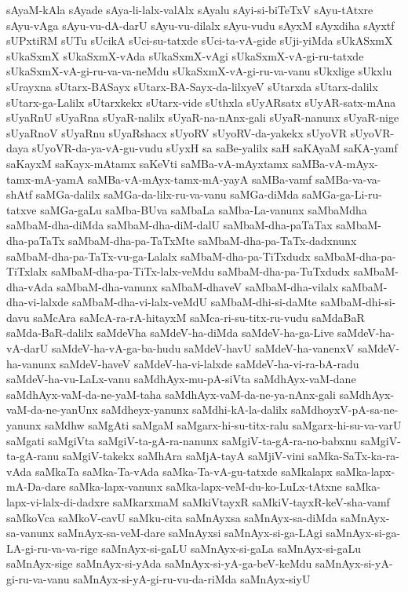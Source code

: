 {sAyaM-kAla
sAyade
sAya-li-lalx-valAlx
sAyalu
sAyi-si-biTeTxV
sAyu-tAtxre
sAyu-vAga
sAyu-vu-dA-darU
sAyu-vu-dilalx
sAyu-vudu
sAyxM
sAyxdiha
sAyxtf
sUPxtiRM
sUTu
sUcikA
sUci-su-tatxde
sUci-ta-vA-gide
sUji-yiMda
sUkASxmX
sUkaSxmX
sUkaSxmX-vAda
sUkaSxmX-vAgi
sUkaSxmX-vA-gi-ru-tatxde
sUkaSxmX-vA-gi-ru-va-va-neMdu
sUkaSxmX-vA-gi-ru-va-vanu
sUkxlige
sUkxlu
sUrayxna
sUtarx-BASayx
sUtarx-BA-Sayx-da-lilxyeV
sUtarxda
sUtarx-dalilx
sUtarx-ga-Lalilx
sUtarxkekx
sUtarx-vide
sUthxla
sUyARsatx
sUyAR-satx-mAna
sUyaRnU
sUyaRna
sUyaR-nalilx
sUyaR-na-nAnx-gali
sUyaR-nanunx
sUyaR-nige
sUyaRnoV
sUyaRnu
sUyaRshacx
sUyoRV
sUyoRV-da-yakekx
sUyoVR
sUyoVR-daya
sUyoVR-da-ya-vA-gu-vudu
sUyxH
sa
saBe-yalilx
saH
saKAyaM
saKA-yamf
saKayxM
saKayx-mAtamx
saKeVti
saMBa-vA-mAyxtamx
saMBa-vA-mAyx-tamx-mA-yamA
saMBa-vA-mAyx-tamx-mA-yayA
saMBa-vamf
saMBa-va-va-shAtf
saMGa-dalilx
saMGa-da-lilx-ru-va-vanu
saMGa-diMda
saMGa-ga-Li-ru-tatxve
saMGa-gaLu
saMba-BUva
saMbaLa
saMba-La-vanunx
saMbaMdha
saMbaM-dha-diMda
saMbaM-dha-diM-dalU
saMbaM-dha-paTaTax
saMbaM-dha-paTaTx
saMbaM-dha-pa-TaTxMte
saMbaM-dha-pa-TaTx-dadxnunx
saMbaM-dha-pa-TaTx-vu-ga-Lalalx
saMbaM-dha-pa-TiTxdudx
saMbaM-dha-pa-TiTxlalx
saMbaM-dha-pa-TiTx-lalx-veMdu
saMbaM-dha-pa-TuTxdudx
saMbaM-dha-vAda
saMbaM-dha-vanunx
saMbaM-dhaveV
saMbaM-dha-vilalx
saMbaM-dha-vi-lalxde
saMbaM-dha-vi-lalx-veMdU
saMbaM-dhi-si-daMte
saMbaM-dhi-si-davu
saMcAra
saMcA-ra-rA-hitayxM
saMca-ri-su-titx-ru-vudu
saMdaBaR
saMda-BaR-dalilx
saMdeVha
saMdeV-ha-diMda
saMdeV-ha-ga-Live
saMdeV-ha-vA-darU
saMdeV-ha-vA-ga-ba-hudu
saMdeV-havU
saMdeV-ha-vanenxV
saMdeV-ha-vanunx
saMdeV-haveV
saMdeV-ha-vi-lalxde
saMdeV-ha-vi-ra-bA-radu
saMdeV-ha-vu-LaLx-vanu
saMdhAyx-mu-pA-siVta
saMdhAyx-vaM-dane
saMdhAyx-vaM-da-ne-yaM-taha
saMdhAyx-vaM-da-ne-ya-nAnx-gali
saMdhAyx-vaM-da-ne-yanUnx
saMdheyx-yanunx
saMdhi-kA-la-dalilx
saMdhoyxV-pA-sa-ne-yanunx
saMdhw
saMgAti
saMgaM
saMgarx-hi-su-titx-ralu
saMgarx-hi-su-va-varU
saMgati
saMgiVta
saMgiV-ta-gA-ra-nanunx
saMgiV-ta-gA-ra-no-babxnu
saMgiV-ta-gA-ranu
saMgiV-takekx
saMhAra
saMjA-tayA
saMjiV-vini
saMka-SaTx-ka-ra-vAda
saMkaTa
saMka-Ta-vAda
saMka-Ta-vA-gu-tatxde
saMkalapx
saMka-lapx-mA-Da-dare
saMka-lapx-vanunx
saMka-lapx-veM-du-ko-LuLx-tAtxne
saMka-lapx-vi-lalx-di-dadxre
saMkarxmaM
saMkiVtayxR
saMkiV-tayxR-keV-sha-vamf
saMkoVca
saMkoV-cavU
saMku-cita
saMnAyxsa
saMnAyx-sa-diMda
saMnAyx-sa-vanunx
saMnAyx-sa-veM-dare
saMnAyxsi
saMnAyx-si-ga-LAgi
saMnAyx-si-ga-LA-gi-ru-va-va-rige
saMnAyx-si-gaLU
saMnAyx-si-gaLa
saMnAyx-si-gaLu
saMnAyx-sige
saMnAyx-si-yAda
saMnAyx-si-yA-ga-beV-keMdu
saMnAyx-si-yA-gi-ru-va-vanu
saMnAyx-si-yA-gi-ru-vu-da-riMda
saMnAyx-siyU
}
